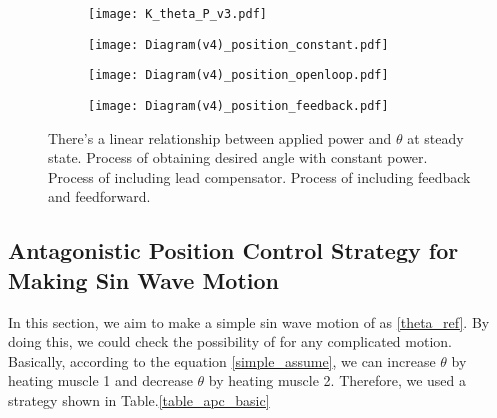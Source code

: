 \begin{figure}[b]
	\centering
	\begin{minipage}{0.35\textwidth}
		\begin{subfigure}{\linewidth}
			\centering
			\texttt{[image: K\_theta\_P\_v3.pdf]}
			\caption{\label{KthetaP}}
		\end{subfigure}
	\end{minipage}%
	\begin{minipage}{0.6\textwidth}
		\begin{subfigure}{\linewidth}
			\texttt{[image: Diagram(v4)\_position\_constant.pdf]}
			\caption{\label{AntaControl_constant}}
		\end{subfigure}
		
		\begin{subfigure}{\linewidth}
			\texttt{[image: Diagram(v4)\_position\_openloop.pdf]}
			\caption{\label{position_open_loop}}
		\end{subfigure}
		
		\begin{subfigure}{\linewidth}
			\texttt{[image: Diagram(v4)\_position\_feedback.pdf]}
			\caption{\label{position_closed_loop}}
		\end{subfigure}
	\end{minipage}
	\caption[Block diagrams for \apc]{ There's a linear relationship between applied power and $\theta$ at steady state.  Process of obtaining desired angle with constant power.  Process of \apc including lead compensator.  Process of \apc including feedback and feedforward.}
	\label{anta_position_diagrams}
\end{figure}


\subsection{Antagonistic Position Control Strategy for Making Sin Wave Motion}
In this section, we aim to make a simple sin wave motion of \anta as \eqref{theta_ref}. By doing this, we could check the possibility of \apc for any complicated motion. Basically, according to the equation \eqref{simple_assume}, we can increase $\theta$ by heating muscle 1 and decrease $\theta$ by heating muscle 2. Therefore, we used a strategy shown in Table.\ref{table_apc_basic}

